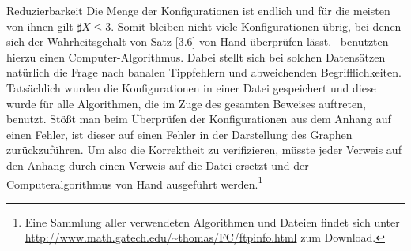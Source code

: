 \begin{section}{Reduzierbarkeit}
 Die Menge der Konfigurationen ist endlich und für die meisten von ihnen gilt $\sharp X \leq 3$. Somit bleiben nicht viele Konfigurationen übrig, bei denen sich der Wahrheitsgehalt von Satz \ref{3.6} von Hand überprüfen lässt. \rsst \-\ benutzten hierzu einen Computer-Algorithmus. Dabei stellt sich bei solchen Datensätzen natürlich die Frage nach banalen Tippfehlern und abweichenden Begrifflichkeiten. Tatsächlich wurden die Konfigurationen in einer Datei gespeichert und diese wurde für alle Algorithmen, die im Zuge des gesamten Beweises auftreten, benutzt. Stößt man beim Überprüfen der Konfigurationen aus dem Anhang auf einen Fehler, ist dieser auf einen Fehler in der Darstellung des Graphen zurückzuführen. Um also die Korrektheit zu verifizieren, müsste jeder Verweis auf den Anhang durch einen Verweis auf die Datei ersetzt und der Computeralgorithmus von Hand ausgeführt werden.\footnote{Eine Sammlung aller verwendeten Algorithmen und Dateien findet sich unter \url{http://www.math.gatech.edu/~thomas/FC/ftpinfo.html} zum Download.}
 

\end{section}

